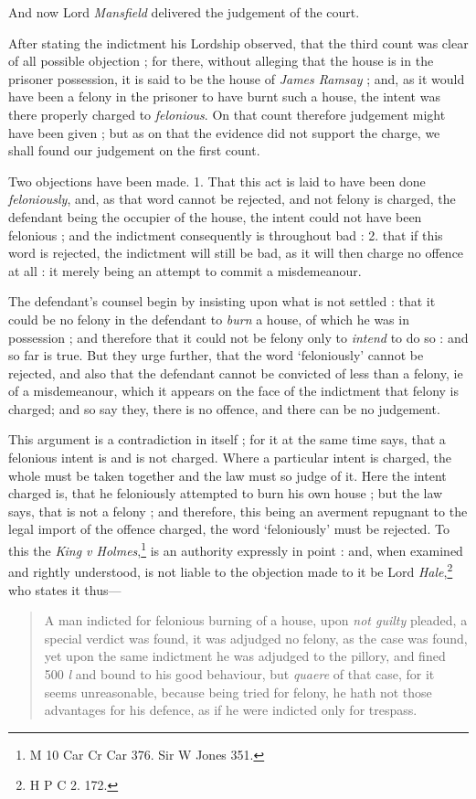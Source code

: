 \documentclass[a4paper]{article}
\begin{document}
 And now Lord \emph{Mansfield} delivered the judgement of the court.

After stating the indictment his Lordship observed, that the third count was clear of all possible objection ; for there, without alleging that the house is in the prisoner possession, it is said to be the house of \emph{James Ramsay} ; and, as it would have been a felony in the prisoner to have burnt such a house, the intent was there properly charged to \emph{felonious}. On that count therefore judgement might have been given ; but as on that the evidence did not support the charge, we shall found our judgement on the first count.

Two objections have been made. 1. That this act is laid to have been done \emph{feloniously}, and, as that word cannot be rejected, and not felony is charged, the defendant being the occupier of the house, the intent could not have been felonious ; and the indictment  consequently is throughout bad : 2. that if this word is rejected, the indictment will still be bad, as it will then charge no offence at all : it merely being an attempt to commit a misdemeanour.

The defendant's counsel begin by insisting upon what is not settled : that it could be no felony in the defendant to \emph{burn} a house, of which he was in possession ; and therefore that it could not be felony only to \emph{intend} to do so : and so far is true. But they urge further, that the word `feloniously' cannot be rejected, and also that the defendant cannot be convicted of less than a felony, ie of a misdemeanour, which it appears on the face of the indictment that felony is charged; and so say they, there is no offence, and there can be no judgement.

This argument is a contradiction in itself ; for it at the same time says, that a felonious intent is and is not charged. Where a particular intent is charged, the whole must be taken together and the law must so judge of it. Here the intent charged is, that he feloniously attempted to burn his own house ; but the law says, that is not a felony ; and therefore, this being an averment repugnant to the legal import of the offence charged, the word `feloniously' must be rejected. To this the \emph{King v Holmes},\footnote{M 10 Car Cr Car 376. Sir W Jones 351.} is an authority expressly in point : and, when examined and rightly understood, is not liable to the objection made to it be Lord \emph{Hale},\footnote{H P C 2. 172.} who states it thus---
\begin{quote}
    A man indicted for felonious burning of a house, upon \emph{not guilty} pleaded, a special verdict was found, it was adjudged no felony, as the case was found, yet upon the same indictment he was adjudged to the pillory, and fined 500 \emph{l} and bound to his good behaviour, but \emph{quaere} of that case, for it seems unreasonable, because being tried for felony, he hath not those advantages for his defence, as if he were indicted only for trespass.
\end{quote}
\end{document}
